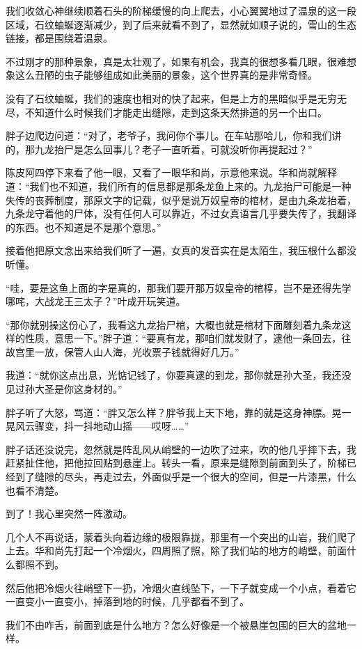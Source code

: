 我们收敛心神继续顺着石头的阶梯缓慢的向上爬去，小心翼翼地过了温泉的这一段区域，石纹蚰蜒逐渐减少，到了后来就看不到了，显然就如顺子说的，雪山的生态链接，都是围绕着温泉。

不过刚才的那种景象，真是太壮观了，如果有机会，我真的很想多看几眼，很难想象这么丑陋的虫子能够组成如此美丽的景象，这个世界真的是非常奇怪。

没有了石纹蚰蜒，我们的速度也相对的快了起来，但是上方的黑暗似乎是无穷无尽，不知道什么时候我们才能走出缝隙，走到这条天然排道的另一个出口。

胖子边爬边问道：“对了，老爷子，我问你个事儿。在车站那哈儿，你和我们讲的，那九龙抬尸是怎么回事儿？老子一直听着，可就没听你再提起过？”

陈皮阿四停下来看了他一眼，又看了一眼华和尚，示意他来说。华和尚就解释道：“我们也不知道，我们所有的信息都是那条龙鱼上来的。九龙抬尸可能是一种失传的丧葬制度，那原文字的记载，似乎是说万奴皇帝的棺材，是由九条龙抬着，九条龙守着他的尸体，没有任何人可以靠近，不过女真语言几乎要失传了，我翻译的东西。也不知道是不是那个意思。”

接着他把原文念出来给我们听了一遍，女真的发音实在是太陌生，我压根什么都没听懂。

“哇，要是这鱼上面的字是真的，那我们要开那万奴皇帝的棺椁，岂不是还得先学哪咤，大战龙王三太子？”叶成开玩笑道。

“那你就别操这份心了，我看这九龙抬尸棺，大概也就是棺材下面雕刻着九条龙这样的性质，意思一下。”胖子道：“要真有龙，那咱们就发财了，逮他一条回去，往故宫里一放，保管人山人海，光收票子钱就得好几万。”

我道：“就你这点出息，光惦记钱了，你要真逮的到龙，那你就是孙大圣，我还没见过孙大圣是你这身材的。”

胖子听了大怒，骂道：“胖又怎么样？胖爷我上天下地，靠的就是这身神膘。晃一晃风云骤变，抖一抖地动山摇——哎呀……”

胖子话还没说完，忽然就是阵乱风从峭壁的一边吹了过来，吹的他几乎摔下去，我赶紧扯住他，把他拉回贴到悬崖上。转头一看，原来是缝隙到前面到头了，阶梯已经到了缝隙的尽头，再走过去，外面似乎是一个很大的空间，但是一片漆黑，什么也看不清楚。

到了！我心里突然一阵激动。

几个人不再说话，蒙着头向着边缘的极限靠拢，那里有一个突出的山岩，我们爬了上去。华和尚先打起一个冷烟火，四周照了照，除了我们站的地方的峭壁，前面什么都照不到。

然后他把冷烟火往峭壁下一扔，冷烟火直线坠下，一下子就变成一个小点，看着它一直变小一直变小，掉落到地的时候，几乎都看不到了。

我们不由咋舌，前面到底是什么地方？怎么好像是一个被悬崖包围的巨大的盆地一样。

